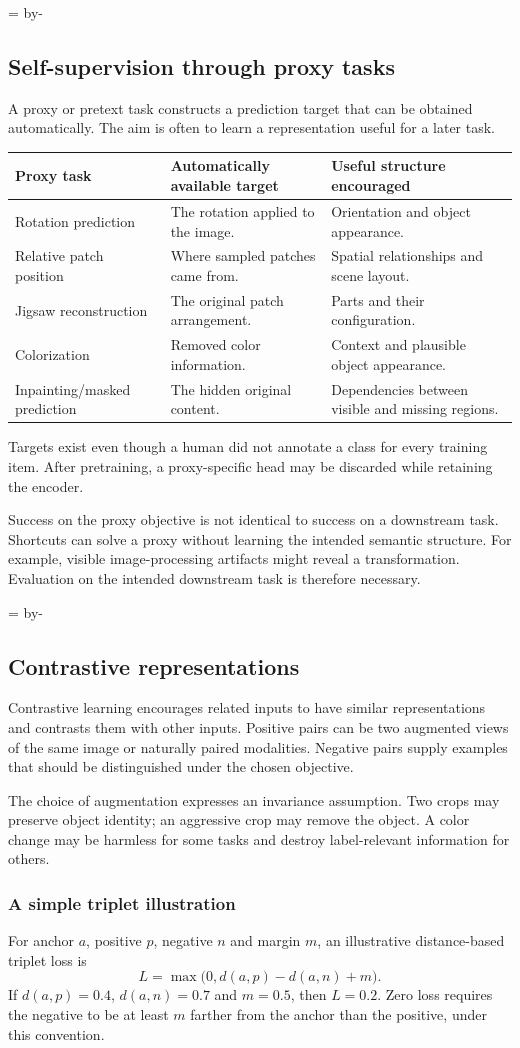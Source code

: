 \documentclass[11pt]{article}
\newcommand{\newsubsection}[1]{\par\begingroup\skip0=\pagegoal\advance\skip0 by-\pagetotal\ifdim\skip0<12\baselineskip\newpage\fi\endgroup\subsection{#1}}
\begin{document}
\newsubsection{Self-supervision through proxy tasks}
A proxy or pretext task constructs a prediction target that can be obtained automatically. The aim is often to learn a representation useful for a later task.
\begin{longtable}{@{}P{.28\textwidth}P{.32\textwidth}P{.30\textwidth}@{}}
\toprule Proxy task & Automatically available target & Useful structure encouraged\\\midrule\endhead
Rotation prediction & The rotation applied to the image. & Orientation and object appearance.\\
Relative patch position & Where sampled patches came from. & Spatial relationships and scene layout.\\
Jigsaw reconstruction & The original patch arrangement. & Parts and their configuration.\\
Colorization & Removed color information. & Context and plausible object appearance.\\
Inpainting/masked prediction & The hidden original content. & Dependencies between visible and missing regions.\\\bottomrule
\end{longtable}
Targets exist even though a human did not annotate a class for every training item. After pretraining, a proxy-specific head may be discarded while retaining the encoder.

Success on the proxy objective is not identical to success on a downstream task. Shortcuts can solve a proxy without learning the intended semantic structure. For example, visible image-processing artifacts might reveal a transformation. Evaluation on the intended downstream task is therefore necessary.

\newsubsection{Contrastive representations}
Contrastive learning encourages related inputs to have similar representations and contrasts them with other inputs. Positive pairs can be two augmented views of the same image or naturally paired modalities. Negative pairs supply examples that should be distinguished under the chosen objective.

The choice of augmentation expresses an invariance assumption. Two crops may preserve object identity; an aggressive crop may remove the object. A color change may be harmless for some tasks and destroy label-relevant information for others.

\subsubsection{A simple triplet illustration}
For anchor $a$, positive $p$, negative $n$ and margin $m$, an illustrative distance-based triplet loss is
\[
L=\max\bigl(0,d(a,p)-d(a,n)+m\bigr).
\]
If $d(a,p)=0.4$, $d(a,n)=0.7$ and $m=0.5$, then $L=0.2$. Zero loss requires the negative to be at least $m$ farther from the anchor than the positive, under this convention.
\end{document}
